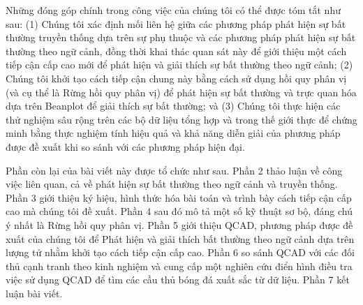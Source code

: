 Những đóng góp chính trong công việc của chúng tôi có thể được tóm tắt như sau: (1) Chúng tôi xác định mối liên hệ giữa các phương pháp phát hiện sự bất thường truyền thống dựa trên sự phụ thuộc và các phương pháp phát hiện sự bất thường theo ngữ cảnh, đồng thời khai thác quan sát này để giới thiệu một cách tiếp cận cấp cao mới để phát hiện và giải thích sự bất thường theo ngữ cảnh; (2) Chúng tôi khởi tạo cách tiếp cận chung này bằng cách sử dụng hồi quy phân vị (và cụ thể là Rừng hồi quy phân vị) để phát hiện sự bất thường và trực quan hóa dựa trên Beanplot để giải thích sự bất thường; và (3) Chúng tôi thực hiện các thử nghiệm sâu rộng trên các bộ dữ liệu tổng hợp và trong thế giới thực để chứng minh bằng thực nghiệm tính hiệu quả và khả năng diễn giải của phương pháp được đề xuất khi so sánh với các phương pháp hiện đại.

Phần còn lại của bài viết này được tổ chức như sau. Phần 2 thảo luận về công việc liên quan, cả về phát hiện sự bất thường theo ngữ cảnh và truyền thống. Phần 3 giới thiệu ký hiệu, hình thức hóa bài toán và trình bày cách tiếp cận cấp cao mà chúng tôi đề xuất. Phần 4 sau đó mô tả một số kỹ thuật sơ bộ, đáng chú ý nhất là Rừng hồi quy phân vị. Phần 5 giới thiệu QCAD, phương pháp được đề xuất của chúng tôi để Phát hiện và giải thích bất thường theo ngữ cảnh dựa trên lượng tử nhằm khởi tạo cách tiếp cận cấp cao. Phần 6 so sánh QCAD với các đối thủ cạnh tranh theo kinh nghiệm và cung cấp một nghiên cứu điển hình điều tra việc sử dụng QCAD để tìm các cầu thủ bóng đá xuất sắc từ dữ liệu. Phần 7 kết luận bài viết.